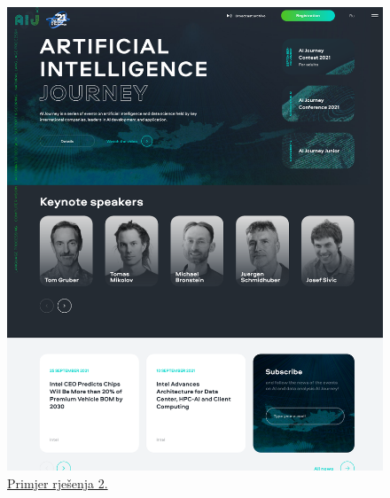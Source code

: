 \begin{figure}[H]
\begin{minipage}[t]{0.4\textwidth}
				\includegraphics[width=\linewidth]{slike/frontpage_example2}
				\caption{\href{https://ai-journey.ru/en}{Primjer rješenja 2.}} \label{fig:frontpage_example2}
			\end{minipage}
		\end{figure}
		
